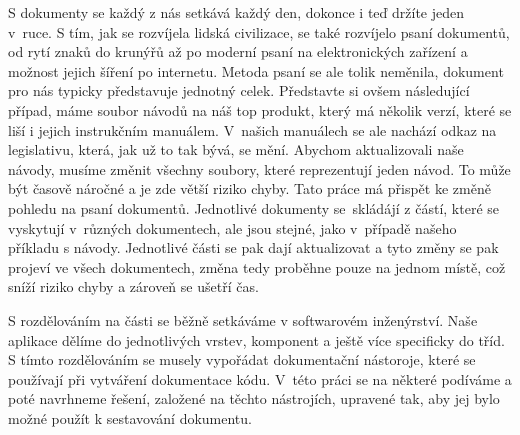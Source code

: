 S dokumenty se každý z nás setkává každý den, dokonce i teď držíte jeden v~ruce. S tím, jak se rozvíjela lidská civilizace,
se také rozvíjelo psaní dokumentů, od rytí znaků do krunýřů až po moderní psaní na elektronických zařízení a možnost jejich šíření po internetu.
Metoda psaní se ale tolik nemě\-nila, dokument pro nás typicky představuje jednotný celek. Představte si ovšem následující případ, máme soubor návodů na náš top
produkt, který má několik verzí, které se liší i jejich instrukčním manuálem. V~našich manuálech se ale nachází odkaz na legislativu, která, jak už to tak
bývá, se mění. Abychom aktualizovali naše návody, musíme změnit všechny soubory, které reprezentují jeden návod. To může být časově náročné a je zde větší riziko
chyby. Tato práce má přispět ke změně pohledu na psaní dokumentů. Jednotlivé dokumenty se~skládájí z částí, které se vyskytují v~různých dokumentech, ale jsou stejné,
jako v~případě našeho příkladu s návody. Jednotlivé části se pak dají aktualizovat a tyto změny se pak projeví ve všech dokumentech, změna tedy proběhne
pouze na jednom místě, což sníží riziko chyby a zároveň se ušetří čas.

S rozdělováním na části se běžně setkáváme v softwarovém inženýrství. Naše aplikace dělíme do jednotlivých vrstev, komponent a ještě více specificky do tříd.
S tímto rozdělováním se musely vypořádat dokumentační nástoroje, které se používají při vytváření dokumentace kódu. V~této práci se na některé podíváme a poté navrhneme řešení,
založené na těchto nástrojích, upravené tak, aby jej bylo možné použít k sestavování dokumentu.